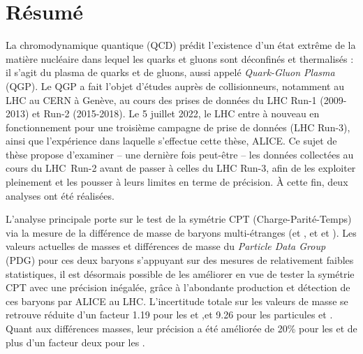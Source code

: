 \chapter*{Résumé}

La chromodynamique quantique (QCD) prédit l’existence d’un état extrême de la matière nucléaire dans lequel les quarks et gluons sont déconfinés et thermalisés : il s'agit du plasma de quarks et de gluons, aussi appelé \textit{Quark-Gluon Plasma} (QGP). Le QGP a fait l’objet d’études auprès de collisionneurs, notamment au LHC au CERN à Genève, au cours des prises de données du LHC Run-1 (2009-2013) et \mbox{Run-2} (2015-2018). Le 5 juillet 2022, le LHC entre à nouveau en fonctionnement pour une troisième campagne de prise de données (LHC Run-3), ainsi que l'expérience dans laquelle s’effectue cette thèse, ALICE. Ce sujet de thèse propose d’examiner -- une dernière fois peut-être -- les données collectées au cours du \mbox{LHC Run-2} avant de passer à celles du LHC Run-3, afin de les exploiter pleinement et les pousser à leurs limites en terme de précision. À cette fin, deux analyses ont été réalisées.

L'analyse principale porte sur le test de la symétrie CPT (Charge-Parité-Temps) via la mesure de la différence de masse de baryons multi-étranges (\rmXiM[$dss$] et \mbox{}, et \rmOmegaM[$sss$] et ). Les valeurs actuelles de masses et différences de masse du \textit{Particle Data Group} (PDG) pour ces deux baryons s’appuyant sur des mesures de relativement faibles statistiques, il est désormais possible de les améliorer en vue de tester la symétrie CPT avec une précision inégalée, grâce à l’abondante production et détection de ces baryons par ALICE au LHC. L’incertitude totale sur les valeurs de masse se retrouve réduite d’un facteur 1.19 pour les \rmXiM et \rmAxiP,\break et 9.26 pour les particules \rmOmegaM et \rmAomegaP. Quant aux différences masses, leur précision a été améliorée de 20\% pour les \rmXi et de plus d'un facteur deux pour les \rmOmega.

